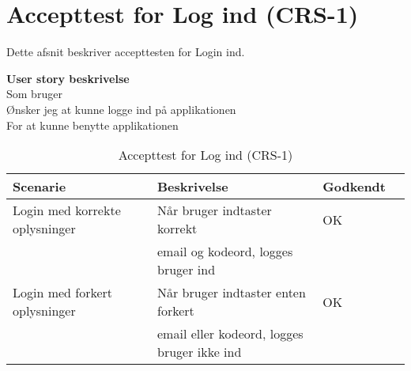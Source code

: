 \section{Accepttest for Log ind (CRS-1)}
Dette afsnit beskriver accepttesten for Login ind.

\textbf{User story beskrivelse} \\
Som bruger \\
Ønsker jeg at kunne logge ind på applikationen \\
For at kunne benytte applikationen

\begin{table}[H]
	\centering
	\begin{tabular}{|ll|l|ll|} \hline
		\textbf{Scenarie} &  & \textbf{Beskrivelse}&  \textbf{Godkendt}&  \\ \hline
		Login med korrekte oplysninger&  &  Når bruger indtaster korrekt &  OK&  \\
		& & email og kodeord, logges bruger ind& & \\ \hline
		Login med forkert oplysninger&  &  Når bruger indtaster enten forkert&  OK&  \\
		& & email eller kodeord, logges bruger ikke ind& & \\ \hline
	\end{tabular}
	\caption{Accepttest for Log ind (CRS-1)}
	\label{AcceptLogin}
\end{table}